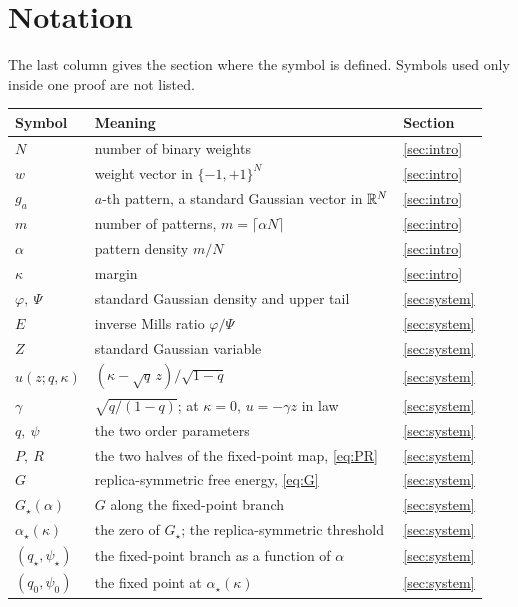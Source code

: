 \section*{Notation}
\label{sec:notation}

The last column gives the section where the symbol is defined.
Symbols used only inside one proof are not listed.

\begin{longtable}{p{}p{}p{}}
\toprule
Symbol & Meaning & Section\\
\midrule
\endhead
\bottomrule
\endfoot
$N$ & number of binary weights & \ref{sec:intro}\\
$w$ & weight vector in $\{-1,+1\}^N$ & \ref{sec:intro}\\
$g_a$ & $a$-th pattern, a standard Gaussian vector in $\mathbb{R}^N$ & \ref{sec:intro}\\
$m$ & number of patterns, $m=\lceil\alpha N\rceil$ & \ref{sec:intro}\\
$\alpha$ & pattern density $m/N$ & \ref{sec:intro}\\
$\kappa$ & margin & \ref{sec:intro}\\
$\varphi,\ \Psi$ & standard Gaussian density and upper tail & \ref{sec:system}\\
$E$ & inverse Mills ratio $\varphi/\Psi$ & \ref{sec:system}\\
$Z$ & standard Gaussian variable & \ref{sec:system}\\
$u(z;q,\kappa)$ & $(\kappa-\sqrt q\,z)/\sqrt{1-q}$ & \ref{sec:system}\\
$\gamma$ & $\sqrt{q/(1-q)}$; at $\kappa=0$, $u=-\gamma z$ in law & \ref{sec:system}\\
$q,\ \psi$ & the two order parameters & \ref{sec:system}\\
$P,\ R$ & the two halves of the fixed-point map, \eqref{eq:PR} & \ref{sec:system}\\
$G$ & replica-symmetric free energy, \eqref{eq:G} & \ref{sec:system}\\
$G_\star(\alpha)$ & $G$ along the fixed-point branch & \ref{sec:system}\\
$\alpha_\star(\kappa)$ & the zero of $G_\star$; the replica-symmetric threshold & \ref{sec:system}\\
$(q_\star,\psi_\star)$ & the fixed-point branch as a function of $\alpha$ & \ref{sec:system}\\
$(q_0,\psi_0)$ & the fixed point at $\alpha_\star(\kappa)$ & \ref{sec:system}\\

\end{longtable}
